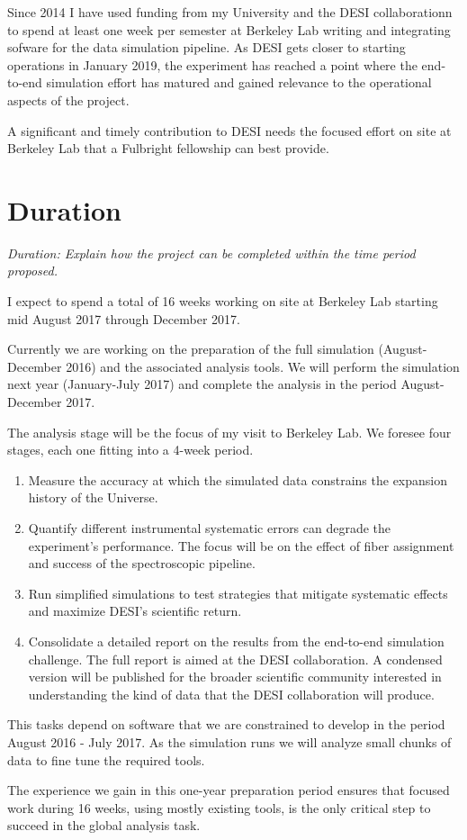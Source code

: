 \documentclass[12pt]{article}
\begin{document}
Since 2014 I have used funding from my University and the DESI
collaborationn to spend at least one week per semester at
Berkeley Lab writing and integrating sofware for the data simulation
pipeline. 
As DESI gets closer to starting operations in January 2019, the
experiment has reached a point where the end-to-end simulation effort
has matured and gained relevance to the operational aspects of the
project. 

A significant and timely contribution to DESI needs the focused effort on
site at Berkeley Lab that a Fulbright fellowship can best provide. 

\section*{Duration}
\textit{ Duration: Explain how the project can be completed within the time
period proposed. }

I expect to spend a total of 16 weeks working on site at Berkeley
Lab starting mid August 2017 through December 2017. 

Currently we are working on the preparation of the full simulation
(August-December 2016) and the associated analysis tools. We will
perform the simulation next year (January-July 2017) and complete the
analysis in the period August-December 2017.  

The analysis stage will be the focus of my visit
to Berkeley Lab.
We foresee four stages, each one fitting into a 4-week period.

\begin{enumerate}
\item Measure the accuracy at which the simulated data constrains the
  expansion history of the Universe.  
\item Quantify different instrumental systematic errors can degrade
  the experiment's performance. The focus will be on the effect of
  fiber assignment and success of the spectroscopic pipeline. 
\item Run simplified simulations to test strategies that mitigate
  systematic effects and maximize DESI's scientific return.
\item Consolidate a detailed report on the results from the end-to-end
  simulation challenge. 
  The full report is aimed at the DESI collaboration. A condensed
  version will be published for the broader scientific community
  interested in understanding the kind of data that the DESI
  collaboration will produce. 
\end{enumerate}

This tasks depend on software that we are constrained to develop in
the period August 2016 - July 2017. As the simulation runs we will
analyze small chunks of data to fine tune the required tools. 

The experience we gain in this one-year preparation period ensures that
focused work during 16 weeks, using mostly existing tools, is the only
critical step to succeed in the global analysis task.
\end{document}
